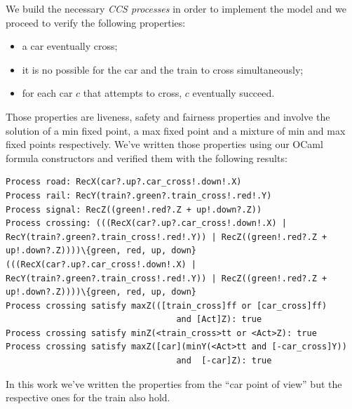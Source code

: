 We build the necessary \emph{CCS processes} in order to implement the
model and we proceed to verify the following properties:
\begin{itemize}
\item a car eventually cross;
\item it is no possible for the car and the train to cross simultaneously;
\item for each car $c$ that attempts to cross, $c$ eventually succeed.
\end{itemize}
Those properties are liveness, safety and fairness properties and
involve the solution of a min fixed point, a max fixed point and a
mixture of min and max fixed points respectively. We've written those
properties using our OCaml formula constructors and verified them with
the following results:
\begin{verbatim}
Process road: RecX(car?.up?.car_cross!.down!.X)
Process rail: RecY(train?.green?.train_cross!.red!.Y)
Process signal: RecZ((green!.red?.Z + up!.down?.Z))
Process crossing: (((RecX(car?.up?.car_cross!.down!.X) |
RecY(train?.green?.train_cross!.red!.Y)) | RecZ((green!.red?.Z +
up!.down?.Z))))\{green, red, up, down}
(((RecX(car?.up?.car_cross!.down!.X) |
RecY(train?.green?.train_cross!.red!.Y)) | RecZ((green!.red?.Z +
up!.down?.Z))))\{green, red, up, down}
Process crossing satisfy maxZ(([train_cross]ff or [car_cross]ff)
                                  and [Act]Z): true
Process crossing satisfy minZ(<train_cross>tt or <Act>Z): true
Process crossing satisfy maxZ([car](minY(<Act>tt and [-car_cross]Y))
                                  and  [-car]Z): true
\end{verbatim}
In this work we've written the properties from the ``car point of
view'' but the respective ones for the train also hold.
